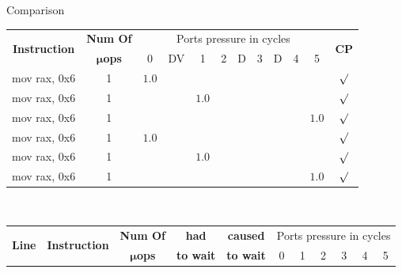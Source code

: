 \documentclass[10pt, tikz,border=2mm, xcolor=dvipsnames]{beamer}
\begin{document}
\begin{frame}[fragile]{Comparison}
\begin{mdframed}[backgroundcolor=light-gray, roundcorner=10pt,leftmargin=1, rightmargin=1, innerleftmargin=15, innertopmargin=5,innerbottommargin=5, outerlinewidth=1, linecolor=light-gray]
    \centering
    \begin{adjustbox}{height=0.17\textheight,width=0.9\textwidth} \begin{tabular}
            {|r|c|c c|c|c c|c c|c|c|c|}
            \hline
            \multicolumn{1}{|c|}{\multirow{2}{*}{\textbf{Instruction}}}&\textbf{Num Of} & \multicolumn{9}{|c|}{Ports pressure in cycles} &\multirow{2}{*}{\textbf{CP}}\\
            \cline{3-11}
            &$\boldsymbol{\mu}$\textbf{ops} & 0 & DV & 1 & 2 & D & 3 & D & 4 & 5 & \\ \cline{1-12}
            mov rax, 0x6 & 1 & $1.0$ &       &       &       &       &       &       &       &       & $\surd$\\
            mov rax, 0x6 & 1 &       &       & $1.0$ &       &       &       &       &       &       & $\surd$\\
            mov rax, 0x6 & 1 &       &       &       &       &       &       &       &       & $1.0$ & $\surd$\\
            mov rax, 0x6 & 1 & $1.0$ &       &       &       &       &       &       &       &       & $\surd$\\
            mov rax, 0x6 & 1 &       &       & $1.0$ &       &       &       &       &       &       & $\surd$\\
            mov rax, 0x6 & 1 &       &       &       &       &       &       &       &       & $1.0$ & $\surd$\\
            \hline
    \end{tabular}\end{adjustbox}\\ \vspace{0.5cm}
    \begin{adjustbox}{height=0.17\textheight,width=0.9\textwidth} \begin{tabular}
            {|c|r|c|c|c|c|c|c|c|c|c|}
            \hline
            \multicolumn{1}{|c|}{\multirow{2}{*}{\textbf{Line}}}&\multicolumn{1}{|c|}{\multirow{2}{*}{\textbf{Instruction}}}&\textbf{Num Of}& \textbf{had} & \textbf{caused} & \multicolumn{6}{|c|}{Ports pressure in cycles}\\
            \cline{6-11}
            &&$\boldsymbol{\mu}$\textbf{ops} & \textbf{to wait} & \textbf{to wait} & 0  & 1 & 2 & 3 & 4 & 5 \\ \cline{1-11}

\end{tabular}
\end{adjustbox}
\end{mdframed}
\end{frame}
\end{document}
